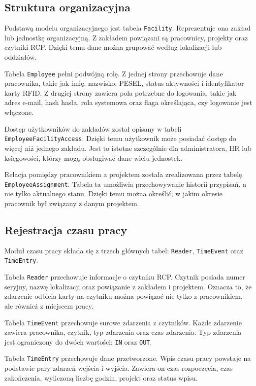 \subsection{Struktura organizacyjna}

Podstawą modelu organizacyjnego jest tabela \texttt{Facility}. Reprezentuje ona zakład lub jednostkę organizacyjną. Z zakładem powiązani są pracownicy, projekty oraz czytniki RCP. Dzięki temu dane można grupować według lokalizacji lub oddziałów.

Tabela \texttt{Employee} pełni podwójną rolę. Z jednej strony przechowuje dane pracownika, takie jak imię, nazwisko, PESEL, status aktywności i identyfikator karty RFID. Z drugiej strony zawiera pola potrzebne do logowania, takie jak adres e-mail, hash hasła, rola systemowa oraz flaga określająca, czy logowanie jest włączone.

Dostęp użytkowników do zakładów został opisany w tabeli \texttt{EmployeeFacilityAccess}. Dzięki temu użytkownik może posiadać dostęp do więcej niż jednego zakładu. Jest to istotne szczególnie dla administratora, HR lub księgowości, którzy mogą obsługiwać dane wielu jednostek.

Relacja pomiędzy pracownikiem a projektem została zrealizowana przez tabelę \texttt{EmployeeAssignment}. Tabela ta umożliwia przechowywanie historii przypisań, a nie tylko aktualnego stanu. Dzięki temu można określić, w jakim okresie pracownik był związany z danym projektem.

\subsection{Rejestracja czasu pracy}

Moduł czasu pracy składa się z trzech głównych tabel: \texttt{Reader}, \texttt{TimeEvent} oraz \texttt{TimeEntry}.

Tabela \texttt{Reader} przechowuje informacje o czytniku RCP. Czytnik posiada numer seryjny, nazwę lokalizacji oraz powiązanie z zakładem i projektem. Oznacza to, że zdarzenie odbicia karty na czytniku można powiązać nie tylko z pracownikiem, ale również z miejscem pracy.

Tabela \texttt{TimeEvent} przechowuje surowe zdarzenia z czytników. Każde zdarzenie zawiera pracownika, czytnik, typ zdarzenia oraz czas zdarzenia. Typ zdarzenia jest ograniczony do dwóch wartości: \texttt{IN} oraz \texttt{OUT}.

Tabela \texttt{TimeEntry} przechowuje dane przetworzone. Wpis czasu pracy powstaje na podstawie pary zdarzeń wejścia i wyjścia. Zawiera on czas rozpoczęcia, czas zakończenia, wyliczoną liczbę godzin, projekt oraz status wpisu.


